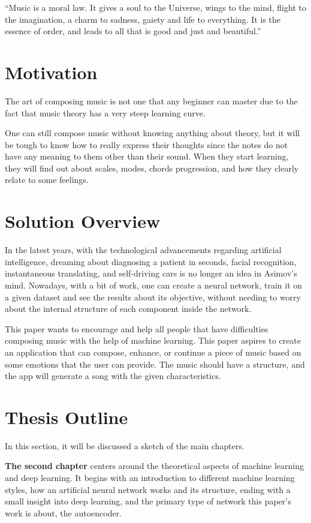 “Music is a moral law. It gives a soul to the Universe, wings to the mind, flight to the imagination, a charm to sadness, gaiety and life to everything.
It is the essence of order, and leads to all that is good and just and beautiful.” \cite{quotationDictionary}

\section{Motivation}

The art of composing music is not one that any beginner can master
due to the fact that music theory has a very steep learning curve.

One can still compose music without knowing anything about theory,
but it will be tough to know how to really express their thoughts
since the notes do not have any meaning to them other than their sound.
When they start learning, they will find out about scales, modes,
chords progression, and how they clearly relate to some feelings.


\section{Solution Overview}

In the latest years, with the technological advancements regarding artificial intelligence,
dreaming about diagnosing a patient in seconds, facial recognition, instantaneous translating,
and self-driving cars is no longer an idea in Asimov’s mind.
Nowadays, with a bit of work, one can create a neural network,
train it on a given dataset and see the results about its objective,
without needing to worry about the internal structure of each component inside the network.

This paper wants to encourage and help all people that
have difficulties composing music with the help of machine learning.
This paper aspires to create an application that can compose, enhance,
or continue a piece of music based on some emotions that the user can provide.
The music should have a structure, and the app will generate a
song with the given characteristics.

\section{Thesis Outline}
In this section, it will be discussed a sketch of the main chapters.

\textbf{The second chapter} centers around the theoretical aspects of machine learning
and deep learning.
It begins with an introduction to different machine learning styles,
how an artificial neural network works and its structure,
ending with a small insight into deep learning,
and the primary type of network this paper's work is about, the autoencoder.

